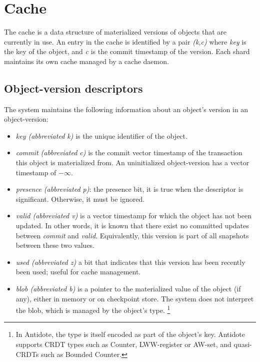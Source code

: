 \documentclass[twoside]{article}
\begin{document}
\section{Cache}
\label{sec:cache}

The cache is a data structure of materialized versions of objects that are 
currently in use. 
An entry in the cache is identified by a pair \emph{(k,c)} where
\emph{key} is the key of the object, and \emph{c} is the commit timestamp of the
version. 
Each shard maintains its own cache managed by a cache daemon.

\subsection{Object-version descriptors}
\label{sec:objects}

The system maintains the following information about an object's version
in an object-version:
\begin{itemize}
\item
  \emph{key (abbreviated k)} is the unique identifier of the object.
\item
  \emph{commit (abbreviated c)} is the commit vector timestamp of the transaction
  this object is materialized from.
  An uninitialized object-version has a vector timestamp of $-\infty$.
\item
\emph{presence (abbreviated p)}: the presence bit, it is true when the descriptor is
significant. 
Otherwise, it must be ignored.
\item
  \emph{valid (abbreviated v)} is a vector timestamp for which the object has
  not been updated.
  In other words, it is known that there exist no committed
  updates between \emph{commit} and \emph{valid}.
  Equivalently, this version is part of all snapshots between these two
  values.
\item
  \emph{used (abbreviated z)} a bit that indicates that this version has been recently been
  used; useful for cache management.
\item
  \emph{blob (abbreviated b)} is a pointer to the materialized value of the object (if
  any), either in memory or on checkpoint store.
  The system does not interpret the blob, which is managed by the
  object's type.%
  \footnote{
    In Antidote, the type is itself encoded as part of the object's key.
    Antidote supports CRDT types such as Counter, LWW-register or
    AW-set, and quasi-CRDTs such as Bounded Counter.
  }
\end{itemize}
\end{document}
